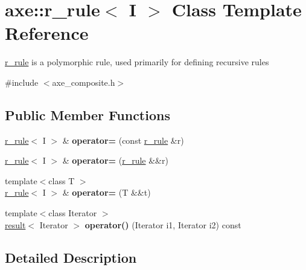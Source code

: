 \hypertarget{classaxe_1_1r__rule}{\section{axe\+:\+:r\+\_\+rule$<$ I $>$ Class Template Reference}
\label{classaxe_1_1r__rule}
}


\hyperlink{classaxe_1_1r__rule}{r\+\_\+rule} is a polymorphic rule, used primarily for defining recursive rules  




{\ttfamily \#include $<$axe\+\_\+composite.\+h$>$}

\subsection*{Public Member Functions}
\begin{DoxyCompactItemize}
\item 
\hypertarget{classaxe_1_1r__rule_a6a6e7f181f325683aa9a4b40b675a5c7}{\hyperlink{classaxe_1_1r__rule}{r\+\_\+rule}$<$ I $>$ \& {\bfseries operator=} (const \hyperlink{classaxe_1_1r__rule}{r\+\_\+rule} \&r)}\label{classaxe_1_1r__rule_a6a6e7f181f325683aa9a4b40b675a5c7}

\item 
\hypertarget{classaxe_1_1r__rule_a23709ed82d29014da9dd25d8e7fdb583}{\hyperlink{classaxe_1_1r__rule}{r\+\_\+rule}$<$ I $>$ \& {\bfseries operator=} (\hyperlink{classaxe_1_1r__rule}{r\+\_\+rule} \&\&r)}\label{classaxe_1_1r__rule_a23709ed82d29014da9dd25d8e7fdb583}

\item 
\hypertarget{classaxe_1_1r__rule_acbe7fa97802cf006a105869f5220ad7f}{{\footnotesize template$<$class T $>$ }\\\hyperlink{classaxe_1_1r__rule}{r\+\_\+rule}$<$ I $>$ \& {\bfseries operator=} (T \&\&t)}\label{classaxe_1_1r__rule_acbe7fa97802cf006a105869f5220ad7f}

\item 
\hypertarget{classaxe_1_1r__rule_aaf69e1628070131363c5cab8634bacd9}{{\footnotesize template$<$class Iterator $>$ }\\\hyperlink{structaxe_1_1result}{result}$<$ Iterator $>$ {\bfseries operator()} (Iterator i1, Iterator i2) const }\label{classaxe_1_1r__rule_aaf69e1628070131363c5cab8634bacd9}

\end{DoxyCompactItemize}


\subsection{Detailed Description}
